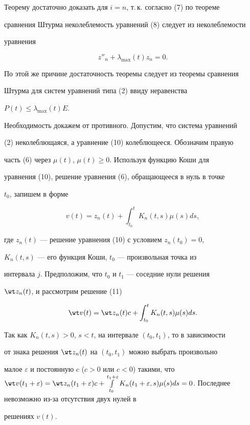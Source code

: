 \begin{pf} 


Теорему достаточно доказать для $i=n$, т.\,к. согласно (7) по теореме 


сравнения Штурма неколеблемость уравнений (8) следует из неколеблемости 


уравнения 


\begin{equation} 


z''_n+\lambda_{\max}(t)z_n=0. 


\end{equation} 


 


По этой же причине достаточность теоремы следует из теоремы сравнения 


Штурма для систем уравнений типа (2) ввиду неравенства 


$P(t)\le\lambda_{\max}(t)E$. 


 


Необходимость докажем от противного. Допустим, что система уравнений 


(2) неколеблющаяся, а уравнение (10) колеблющееся. Обозначим правую 


часть (6) через $\mu(t)$, $\mu(t)\ge0$. Используя функцию Коши для 


уравнения (10), решение уравнения (6), обращающееся в нуль в точке 


$t_0$, запишем в форме 


\begin{equation} 


v(t)=z_n(t)+\int^t_{t_0}K_n(t,s)\mu(s)ds, 


\end{equation} 


где $z_n(t)$ --- решение уравнения (10) с условием $z_n(t_0)=0$, 


$K_n(t,s)$ --- его функция Коши, $t_0$ --- произвольная точка из 


интервала $j$. Предположим, что $t_0$ и $t_1$ --- соседние нули решения 


$\wt z_n(t)$, и рассмотрим решение (11) 


$$ 


\wt v(t)=\wt z_n(t)c+\int^t_{t_0}K_n(t,s)\mu(s)ds. 


$$ 


Так как $K_n(t,s)>0$, $s<t$, на интервале $(t_0,t_1)$, то в зависимости 


от знака решения $\wt z_n(t)$ на $(t_0,t_1)$ можно выбрать произвольно 


малое $\varepsilon$ и постоянную $c$ ($c>0$ или $c<0$) такими, что $\wt 


v(t_1+\varepsilon)=\wt z_n(t_1+\varepsilon)c+ 


\int\limits^{t_1+\varepsilon}_{t_0}K_n(t_1+\varepsilon,s) 


\mu(s)ds=0$. Последнее невозможно из-за отсутствия двух нулей в 


решениях $v(t)$. 


\end{pf} 


